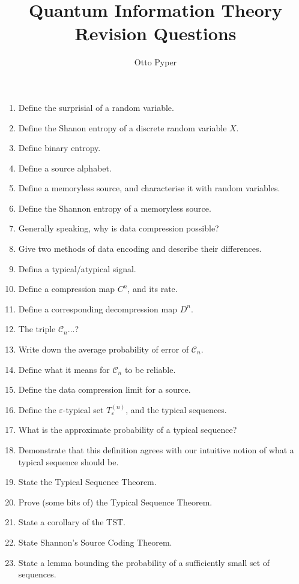 \documentclass{article}
\title{Quantum Information Theory Revision Questions}
\author{Otto Pyper}
\date{}
\newcommand{\eps}{\varepsilon}
\begin{document}
    
\maketitle



\begin{enumerate}
    \item Define the surprisial of a random variable.
    \item Define the Shanon entropy of a discrete random variable $X$.
    \item Define binary entropy.
    \item Define a source alphabet.
    \item Define a memoryless source, and characterise it with random variables.
    \item Define the Shannon entropy of a memoryless source.
    \item Generally speaking, why is data compression possible?
    \item Give two methods of data encoding and describe their differences.
    \item Defina a typical/atypical signal.
    \item Define a compression map $C^n$, and its rate.
    \item Define a corresponding decompression map $D^n$.
    \item The triple $\mathcal{C}_n$...?
    \item Write down the average probability of error of $\mathcal{C}_n$.
    \item Define what it means for $\mathcal{C}_n$ to be reliable.
    \item Define the data compression limit for a source.
    \item Define the $\eps$-typical set $T_\eps^{(n)}$, and the typical sequences.
    \item What is the approximate probability of a typical sequence?
    \item Demonstrate that this definition agrees with our intuitive notion of what a typical sequence should be.
    \item State the Typical Sequence Theorem.
    \item Prove (some bits of) the Typical Sequence Theorem.
    \item State a corollary of the TST.
    \item State Shannon's Source Coding Theorem.
    \item State a lemma bounding the probability of a sufficiently small set of sequences.

\end{enumerate}
\end{document}
